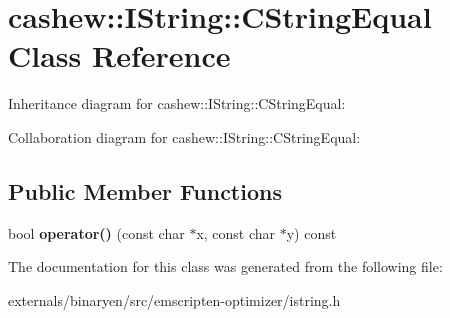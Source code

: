 \hypertarget{classcashew_1_1_i_string_1_1_c_string_equal}{}\section{cashew\+:\+:I\+String\+:\+:C\+String\+Equal Class Reference}
\label{classcashew_1_1_i_string_1_1_c_string_equal}


Inheritance diagram for cashew\+:\+:I\+String\+:\+:C\+String\+Equal\+:


Collaboration diagram for cashew\+:\+:I\+String\+:\+:C\+String\+Equal\+:
\subsection*{Public Member Functions}
\begin{DoxyCompactItemize}
\item 
\mbox{\label{classcashew_1_1_i_string_1_1_c_string_equal_ac5b4861edd5ff25b7e2a23a55b9822b6}} 
bool {\bfseries operator()} (const char $\ast$x, const char $\ast$y) const
\end{DoxyCompactItemize}


The documentation for this class was generated from the following file\+:\begin{DoxyCompactItemize}
\item 
externals/binaryen/src/emscripten-\/optimizer/istring.\+h\end{DoxyCompactItemize}
